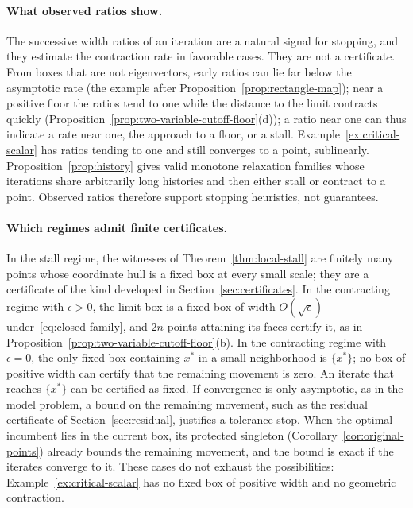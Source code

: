 \paragraph{What observed ratios show.} The successive width ratios of an
iteration are a natural signal for stopping, and they estimate the
contraction rate in favorable cases. They are not a certificate. From boxes
that are not eigenvectors, early ratios can lie far below the asymptotic
rate (the example after Proposition~\ref{prop:rectangle-map});
near a positive floor the ratios tend to one while the distance to the
limit contracts quickly (Proposition~\ref{prop:two-variable-cutoff-floor}(d));
a ratio near one can thus indicate a rate near one, the approach to a floor,
or a stall. Example~\ref{ex:critical-scalar} has ratios tending to one and still
converges to a point, sublinearly. Proposition~\ref{prop:history} gives valid
monotone relaxation families whose iterations share arbitrarily long
histories and then either stall or contract to a point. Observed ratios
therefore support stopping heuristics, not guarantees.

\paragraph{Which regimes admit finite certificates.} In the stall regime,
the witnesses of Theorem~\ref{thm:local-stall} are finitely many points
whose coordinate hull is a fixed box at every small scale; they are a
certificate of the kind developed in Section~\ref{sec:certificates}. In the
contracting regime with $\epsilon>0$, the limit box is a fixed box of width
$O(\sqrt\epsilon)$ under~\eqref{eq:closed-family}, and $2n$ points
attaining its faces certify it, as in
Proposition~\ref{prop:two-variable-cutoff-floor}(b). In the contracting
regime with $\epsilon=0$, the only fixed box containing $x^*$ in a small
neighborhood is $\{x^*\}$; no box of positive width can certify that the
remaining movement is zero. An iterate that reaches $\{x^*\}$ can be
certified as fixed. If convergence is only asymptotic, as in the model
problem, a bound on the remaining movement, such as the residual certificate
of Section~\ref{sec:residual}, justifies a tolerance stop. When the optimal
incumbent lies in the current box, its protected singleton
(Corollary~\ref{cor:original-points}) already bounds the remaining movement,
and the bound is exact if the iterates converge to it.
These cases do not exhaust the possibilities:
Example~\ref{ex:critical-scalar} has no fixed box of positive width and no
geometric contraction.

